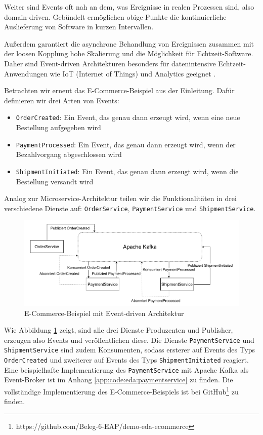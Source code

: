 \documentclass[acmtog]{acmart}
\begin{document}
Weiter sind Events oft nah an dem, was Ereignisse in realen Prozessen sind, also domain-driven.
Gebündelt ermöglichen obige Punkte die kontinuierliche Auslieferung von Software in kurzen Intervallen.

Außerdem garantiert die asynchrone Behandlung von Ereignissen zusammen mit der loosen Kopplung hohe Skalierung und die Möglichkeit für Echtzeit-Software.
Daher sind Event-driven Architekturen besonders für datenintensive Echtzeit-Anwendungen wie IoT (Internet of Things) und Analytics geeignet \cite{iotEda}.

Betrachten wir erneut das E-Commerce-Beispiel aus der Einleitung.
Dafür definieren wir drei Arten von Events:
\begin{itemize}
  \item \texttt{OrderCreated}: Ein Event, das genau dann erzeugt wird, wenn eine neue Bestellung aufgegeben wird
  \item \texttt{PaymentProcessed}: Ein Event, das genau dann erzeugt wird, wenn der Bezahlvorgang abgeschlossen wird
  \item \texttt{ShipmentInitiated}: Ein Event, das genau dann erzeugt wird, wenn die Bestellung versandt wird
\end{itemize}

Analog zur Microservice-Architektur teilen wir die Funktionalitäten in drei verschiedene Dienste auf: \texttt{OrderService}, \texttt{PaymentService} und \texttt{ShipmentService}.

\begin{figure}[!h]
  \centering
  \includegraphics[width=\linewidth]{images/eda/eda-ecommerce.drawio}
  \caption{E-Commerce-Beispiel mit Event-driven Architektur}
  \label{fig:edaecommerce}
\end{figure}
Wie Abbildung \ref{fig:edaecommerce} zeigt, sind alle drei Dienste Produzenten und Publisher, erzeugen also Events und veröffentlichen diese.
Die Dienste \texttt{PaymentService} und \texttt{ShipmentService} sind zudem Konsumenten,
sodass ersterer auf Events des Typs \texttt{OrderCreated} und zweiterer auf Events des Typs \texttt{ShipmentInitiated} reagiert.
Eine beispielhafte Implementierung des \texttt{PaymentService} mit Apache Kafka als Event-Broker ist im Anhang \ref{app:code:eda:paymentservice} zu finden.
Die vollständige Implementierung des E-Commerce-Beispiels ist bei GitHub\footnote{https://github.com/Beleg-6-EAP/demo-eda-ecommerce} zu finden.
\end{document}
